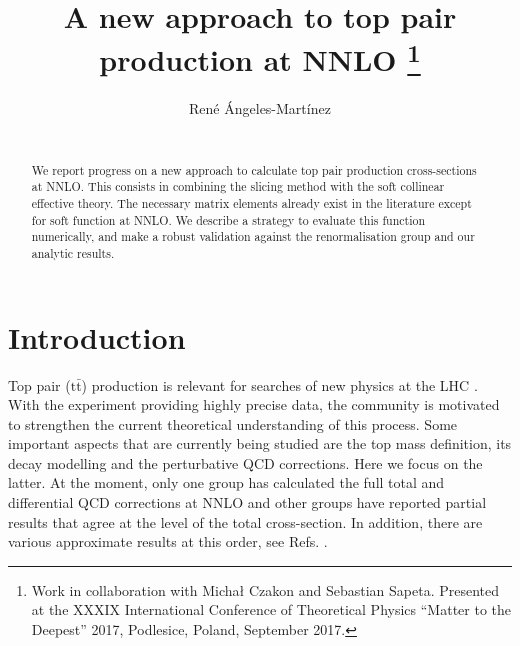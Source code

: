 \documentclass{appolb}
\newcommand{\ttb}{\text{t} \bar{\text{t}} }
\begin{document}
\title{A new approach to top pair production at NNLO%
\thanks{
Work in collaboration with Micha\l{} Czakon and Sebastian Sapeta.
Presented at the XXXIX International Conference of Theoretical Physics ``Matter to the
Deepest'' 2017, Podlesice, Poland, September 2017.}%
}
\author{Ren\'e \'Angeles-Mart\'inez
\address{H. Niewodnicza\'{n}ski Institute of Nuclear Physics, Radzikowskiego 152, Krak\'ow, Poland}
\\[1.5ex]
{
}
}
\maketitle%
\begin{abstract}
We report progress on a new approach to calculate  top pair production cross-sections at NNLO. This consists in combining the slicing method with the soft collinear effective theory. The necessary matrix elements already exist in the literature except for soft function at NNLO. We describe a strategy to evaluate this function numerically, and make a robust validation against the renormalisation group and our analytic results.   

 \end{abstract}
  
\section{Introduction}
Top pair ($\ttb$) production is relevant for searches of new physics at the LHC \cite{Czakon:2015xqa}. With the experiment providing highly precise data, the community is motivated to strengthen the current theoretical understanding of this process.  Some important aspects that are currently being studied are the top mass definition, its decay modelling and the  perturbative QCD corrections. Here we focus on the latter. 
At the moment, only one group has calculated the full total and differential QCD corrections at NNLO
 \cite{Czakon:2013goa,Czakon:2015owf,Czakon:2017wor} and other groups have reported partial results 
\cite{Abelof:2015lna,Abelof:2014jna,Bonciani:2015sha} that agree at the level of the total cross-section. In addition, there are various approximate results at this order, see Refs. \cite{Ahrens:2010zv,Ahrens:2011mw,Kidonakis:2012rm,Kidonakis:2014pja,Gao:2012ja,Brucherseifer:2013iv}. 
\end{document}
